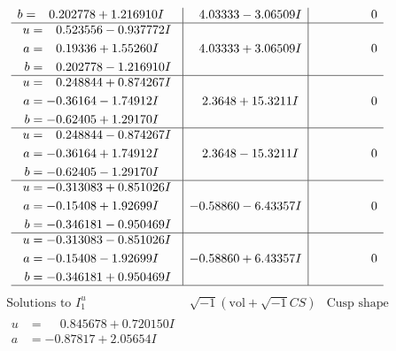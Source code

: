 \documentclass[1p]{elsarticle_modified}
\theoremstyle{definition}
\newcommand{\I}{\sqrt{-1}}
\begin{document}
$$\begin{array}{c|c|c}
\begin{aligned}
b &= \phantom{-}0.202778 + 1.216910 I\end{aligned}
 & \phantom{-}4.03333 - 3.06509 I & \phantom{-0.000000 } 0 \\ \hline\begin{aligned}
u &= \phantom{-}0.523556 - 0.937772 I \\
a &= \phantom{-}0.19336 + 1.55260 I \\
b &= \phantom{-}0.202778 - 1.216910 I\end{aligned}
 & \phantom{-}4.03333 + 3.06509 I & \phantom{-0.000000 } 0 \\ \hline\begin{aligned}
u &= \phantom{-}0.248844 + 0.874267 I \\
a &= -0.36164 - 1.74912 I \\
b &= -0.62405 + 1.29170 I\end{aligned}
 & \phantom{-}2.3648 + 15.3211 I & \phantom{-0.000000 } 0 \\ \hline\begin{aligned}
u &= \phantom{-}0.248844 - 0.874267 I \\
a &= -0.36164 + 1.74912 I \\
b &= -0.62405 - 1.29170 I\end{aligned}
 & \phantom{-}2.3648 - 15.3211 I & \phantom{-0.000000 } 0 \\ \hline\begin{aligned}
u &= -0.313083 + 0.851026 I \\
a &= -0.15408 + 1.92699 I \\
b &= -0.346181 - 0.950469 I\end{aligned}
 & -0.58860 - 6.43357 I & \phantom{-0.000000 } 0 \\ \hline\begin{aligned}
u &= -0.313083 - 0.851026 I \\
a &= -0.15408 - 1.92699 I \\
b &= -0.346181 + 0.950469 I\end{aligned}
 & -0.58860 + 6.43357 I & \phantom{-0.000000 } 0\\
 \hline 
 \end{array}$$\newpage$$\begin{array}{c|c|c}  
\text{Solutions to }I^u_{1}& \I (\text{vol} + \sqrt{-1}CS) & \text{Cusp shape}\\
 \hline 
\begin{aligned}
u &= \phantom{-}0.845678 + 0.720150 I \\
a &= -0.87817 + 2.05654 I \\

\end{aligned}
\end{array}$$
\end{document}

